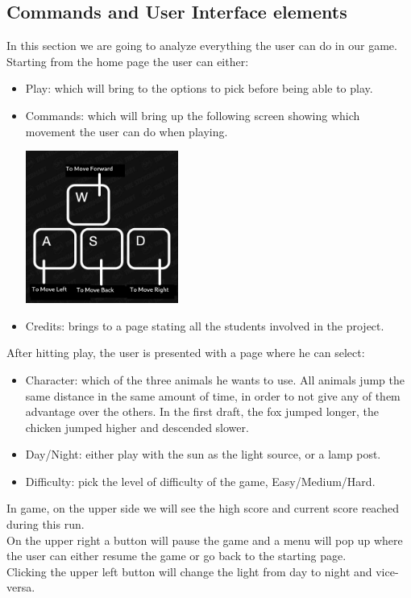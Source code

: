 \documentclass[a4paper, 11pt]{article}
\begin{document}
\subsection{Commands and User Interface elements}
In this section we are going to analyze everything the user can do in our game.\\
Starting from the home page the user can either:
\begin{itemize}
\item Play: which will bring to the options to pick before being able to play.
\item Commands: which will bring up the following screen showing which movement the user can do when playing.
\begin{center}
	\includegraphics[width = 5cm]{commads.jpg}\\
\end{center}
\item Credits: brings to a page stating all the students involved in the project.
\end{itemize}
After hitting play, the user is presented with a page where he can select:
\begin{itemize}
\item Character: which of the three animals he wants to use. All animals jump the same distance in the same amount of time, in order to not give any of them advantage over the others. In the first draft, the fox jumped longer, the chicken jumped higher and descended slower.
\item Day/Night: either play with the sun as the light source, or a lamp post.
\item Difficulty: pick the level of difficulty of the game, Easy/Medium/Hard.
\end{itemize}
In game, on the upper side we will see the high score and current score reached during this run.\\
On the upper right a button will pause the game and a menu will pop up where the user can either resume the game or go back to the starting page.\\
Clicking the upper left button will change the light from day to night and vice-versa.
\end{document}
